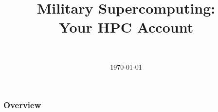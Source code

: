 \documentclass[]{beamer}
\title[Military Supercomputing: Your HPC Accounts]{Military Supercomputing:\\Your HPC Account}
\author[Daniel Topa]{\TopaHII \\ \TopaHIIEmail}
\institute{\missiontech}
\date{\today}
\begin{document}
\begin{frame}
	\titlepage
\end{frame}

\begin{frame}\frametitle{Overview}
	\tableofcontents[hideallsubsections]
\end{frame}

	
	
	


\begin{frame}
	\titlepage
\end{frame}
\end{document}
